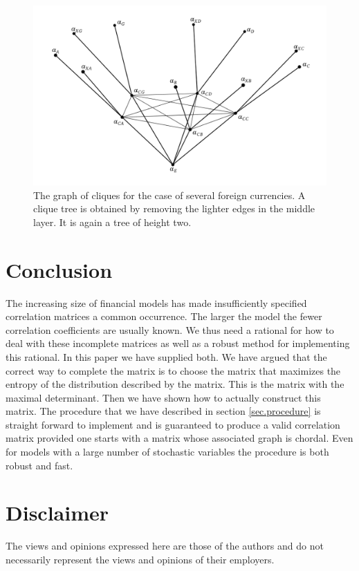 \documentclass[11pt, a4paper]{article}
\begin{document}
\begin{figure}[hbt]
  \begin{center}
  	\includegraphics[width=12cm]{img/severalCurrCliques.png}
  \end{center}
  \caption{The graph of cliques for the case of several foreign currencies. A clique tree is obtained by removing the lighter edges in the middle layer. It is again a tree of height two.}\label{fig.severalCliques}
\end{figure}

\section{Conclusion}\label{sec.conclusion}
The increasing size of financial models has made insufficiently specified correlation matrices a common occurrence. The larger the model the fewer correlation coefficients are usually known. We thus need a rational for how to deal with these incomplete matrices as well as a robust method for implementing this rational. In this paper we have supplied both. We have argued that the correct way to complete the matrix is to choose the matrix that maximizes the entropy of the distribution described by the matrix. This is the matrix with the maximal determinant. Then we have shown how to actually construct this matrix. The procedure that we have described in section \ref{sec.procedure} is straight forward to implement and is guaranteed to produce a valid correlation matrix provided one starts with a matrix whose associated graph is chordal. Even for models with a large number of stochastic variables the procedure is both robust and fast. 

\vspace{2cm}

\section*{Disclaimer}
The views and opinions expressed here are those of the authors and do not necessarily represent the views and opinions of their employers.
\end{document}
